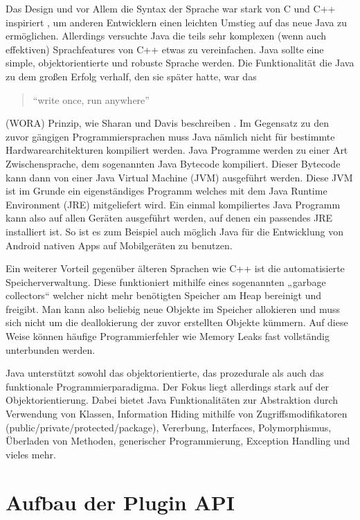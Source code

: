 Das Design und vor Allem die Syntax der Sprache war stark von C und C++ inspiriert \cite{ArnoldKen1996TJpl}, 
um anderen Entwicklern einen leichten Umstieg auf das neue Java zu ermöglichen. 
Allerdings versuchte Java die teils sehr komplexen (wenn auch effektiven) 
Sprachfeatures von C++ etwas zu vereinfachen. Java sollte eine simple, objektorientierte 
und robuste Sprache werden. Die Funktionalität die Java zu dem großen Erfolg verhalf, 
den sie später hatte, war das 
\begin{quote}\begin{english}\enquote{write once, run anywhere}\end{english}\end{quote}
(WORA) Prinzip, wie Sharan und Davis beschreiben \cite{SharanKishori2022BJ1f}. Im Gegensatz 
zu den zuvor gängigen Programmiersprachen muss Java nämlich nicht für bestimmte 
Hardwarearchitekturen kompiliert werden. Java Programme werden zu einer Art 
Zwischensprache, dem sogenannten Java Bytecode kompiliert. Dieser Bytecode
kann dann von einer Java Virtual Machine (JVM) ausgeführt werden. Diese JVM ist
im Grunde ein eigenständiges Programm welches mit dem Java Runtime Environment 
(JRE) mitgeliefert wird. Ein einmal kompiliertes Java Programm kann also auf 
allen Geräten ausgeführt werden, auf denen ein passendes JRE installiert ist. 
So ist es zum Beispiel auch möglich Java für die Entwicklung von Android nativen
Apps auf Mobilgeräten zu benutzen.

Ein weiterer Vorteil gegenüber älteren Sprachen wie C++ ist die
automatisierte Speicherverwaltung. Diese funktioniert mithilfe eines 
sogenannten „garbage collectors“ welcher nicht mehr benötigten Speicher
am Heap bereinigt und freigibt. Man kann also beliebig neue Objekte im Speicher
allokieren und muss sich nicht um die deallokierung der zuvor erstellten Objekte
kümmern. Auf diese Weise können häufige Programmierfehler wie Memory Leaks fast 
vollständig unterbunden werden.

Java unterstützt sowohl das objektorientierte, das prozedurale als auch das funktionale 
Programmierparadigma. Der Fokus liegt allerdings stark auf der Objektorientierung. 
Dabei bietet Java Funktionalitäten zur Abstraktion durch Verwendung von Klassen, Information Hiding
mithilfe von Zugriffsmodifikatoren (public/private/protected/package), Vererbung, 
Interfaces, Polymorphismus, Überladen von Methoden, generischer Programmierung, 
Exception Handling und vieles mehr.

\section{Aufbau der Plugin API}
\label{sec:AufbauDerPluginAPI}

